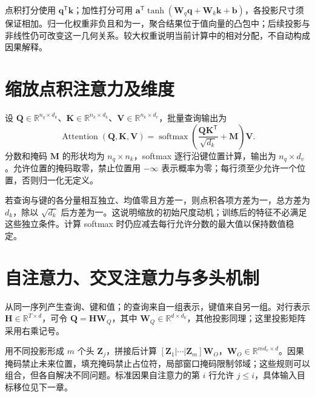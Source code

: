 \documentclass[UTF8,12pt,a4paper,fontset=fandol]{ctexbook}
\begin{document}
点积打分使用 $\mathbf q^\mathsf T\mathbf k$；加性打分可用 $\mathbf a^\mathsf T\tanh(\mathbf W_q\mathbf q+\mathbf W_k\mathbf k+\mathbf b)$，各投影尺寸须保证相加。归一化权重非负且和为一，聚合结果位于值向量的凸包中；后续投影与非线性仍可改变这一几何关系。较大权重说明当前计算中的相对分配，不自动构成因果解释。

\section{缩放点积注意力及维度}
设 $\mathbf Q\in\mathbb R^{n_q\times d_k}$、$\mathbf K\in\mathbb R^{n_k\times d_k}$、$\mathbf V\in\mathbb R^{n_k\times d_v}$，批量查询输出为
\begin{equation}
\operatorname{Attention}(\mathbf Q,\mathbf K,\mathbf V)
=\operatorname{softmax}\!\left(\frac{\mathbf Q\mathbf K^\mathsf T}{\sqrt{d_k}}+\mathbf M\right)\mathbf V.
\label{eq:dl-attention}
\end{equation}
分数和掩码 $\mathbf M$ 的形状均为 $n_q\times n_k$，softmax 逐行沿键位置计算，输出为 $n_q\times d_v$。允许位置的掩码取零，禁止位置用 $-\infty$ 表示概率为零；每行须至少允许一个位置，否则归一化无定义。

若查询与键的各分量相互独立、均值零且方差一，则点积各项方差为一，总方差为 $d_k$，除以 $\sqrt{d_k}$ 后方差为一。这说明缩放的初始尺度动机；训练后的特征不必满足这些独立条件。计算 softmax 时仍应减去每行允许分数的最大值以保持数值稳定。

\section{自注意力、交叉注意力与多头机制}
从同一序列产生查询、键和值；的查询来自一组表示，键值来自另一组。对行表示 $\mathbf H\in\mathbb R^{T\times d}$，可令 $\mathbf Q=\mathbf H\mathbf W_Q$，其中 $\mathbf W_Q\in\mathbb R^{d\times d_k}$，其他投影同理；这里投影矩阵采用右乘记号。

用不同投影形成 $m$ 个头 $\mathbf Z_j$，拼接后计算 $[\mathbf Z_1|\cdots|\mathbf Z_m]\mathbf W_O$，$\mathbf W_O\in\mathbb R^{md_v\times d}$。因果掩码禁止未来位置，填充掩码禁止占位符，局部窗口掩码限制邻域；这些规则可以组合，但各自解决不同问题。标准因果自注意力的第 $i$ 行允许 $j\leq i$，具体输入目标移位见下一章。
\end{document}
